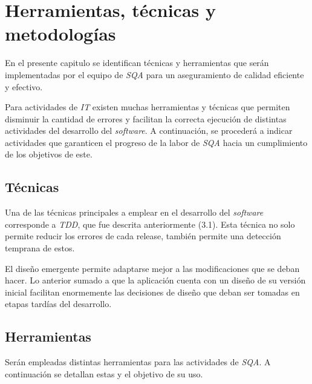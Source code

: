 
\chapter{Herramientas, técnicas y metodologías}

En el presente capitulo se identifican técnicas y herramientas que serán implementadas por el equipo de \textit{SQA} para un aseguramiento de calidad eficiente y efectivo.

Para actividades de \textit{IT} existen muchas herramientas y técnicas que permiten disminuir la cantidad de errores y facilitan la correcta ejecución de distintas actividades del desarrollo del \textit{software}. A continuación, se procederá a indicar actividades que garanticen el progreso de la labor de \textit{SQA} hacia un cumplimiento de los objetivos de este.

\section{Técnicas}

Una de las técnicas principales a emplear en el desarrollo del \textit{software} corresponde a \textit{TDD}, que fue descrita anteriormente (3.1). Esta técnica no solo permite reducir los errores de cada release, también permite una detección temprana de estos.

El diseño emergente permite adaptarse mejor a las modificaciones que se deban hacer. Lo anterior sumado a que la aplicación cuenta con un diseño de su versión inicial facilitan enormemente las decisiones de diseño que deban ser tomadas en etapas tardías del desarrollo.

\section{Herramientas}

Serán empleadas distintas herramientas para las actividades de \textit{SQA}. A continuación se detallan estas y el objetivo de su uso.

